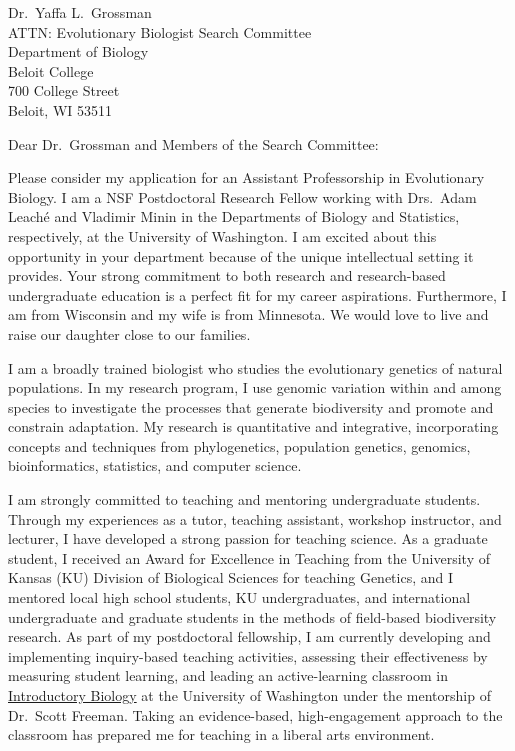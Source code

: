 \documentclass[letterpaper, 10pt]{letter}
\begin{document}
\begin{letter}{Dr.\ Yaffa L.\ Grossman \\
                     ATTN: Evolutionary Biologist Search Committee \\
                     Department of Biology\\
                     Beloit College \\
                     700 College Street \\
                     Beloit, WI 53511}
\opening{Dear Dr.\ Grossman and Members of the Search Committee:}
Please consider my application for an Assistant Professorship in Evolutionary 
Biology.
I am a NSF Postdoctoral Research Fellow working with Drs.\ Adam Leach\'{e} and
Vladimir Minin in the Departments of Biology and Statistics, respectively, at
the University of Washington.
I am excited about this opportunity in your department because of the unique
intellectual setting it provides.
Your strong commitment to both research and research-based undergraduate
education is a perfect fit for my career aspirations.
Furthermore, I am from Wisconsin and my wife is from Minnesota. We would love
to live and raise our daughter close to our families.

I am a broadly trained biologist who studies the evolutionary genetics of
natural populations.
In my research program, I use genomic variation within and among species to
investigate the processes that generate biodiversity and promote and constrain
adaptation.
My research is quantitative and integrative, incorporating concepts and
techniques from phylogenetics, population genetics, genomics, bioinformatics,
statistics, and computer science.

I am strongly committed to teaching and mentoring undergraduate
students.
Through my experiences as a tutor, teaching assistant, workshop instructor,
and lecturer, I have developed a strong passion for teaching science.
As a graduate student, I received an Award for Excellence in Teaching from the
University of Kansas (KU) Division of Biological Sciences for teaching
Genetics, and I mentored local high school students, KU undergraduates, and
international undergraduate and graduate students in the methods of field-based
biodiversity research.
As part of my postdoctoral fellowship, I am currently developing and
implementing inquiry-based teaching activities, assessing their effectiveness
by measuring student learning, and leading an active-learning classroom in
\href{http://courses.biology.washington.edu/biol180/}{Introductory Biology} at
the University of Washington under the mentorship of Dr.\ Scott Freeman.
Taking an evidence-based, high-engagement approach to the classroom has
prepared me for teaching in a liberal arts environment.



\end{letter}
\end{document}
